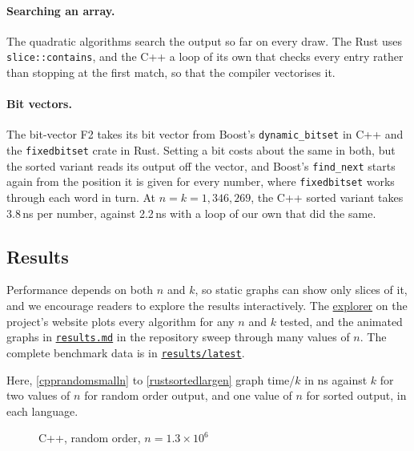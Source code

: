 \documentclass[letterpaper,11pt]{article}
\newcommand{\repo}[2]{\href{https://github.com/ciphergoth/sansreplace/blob/paper_v1/#1}{#2}}
\begin{document}
\paragraph{Searching an array.} The quadratic algorithms search the
output so far on every draw. The Rust uses
\texttt{slice::contains}, and the C++ a loop of its own that
checks every entry rather than stopping at the first match, so that the
compiler vectorises it.

\paragraph{Bit vectors.} The bit-vector F2 takes its bit vector from
Boost's \texttt{dynamic_bitset} in C++ and the
\texttt{fixedbitset} crate in Rust. Setting a bit costs about
the same in both, but the sorted variant reads its output off the
vector, and Boost's \texttt{find_next} starts again from the
position it is given for every number, where
\texttt{fixedbitset} works through each word in turn. At
\(n = k = 1{,}346{,}269\), the C++ sorted variant takes 3.8\,ns per
number, against 2.2\,ns with a loop of our own that did the same.

\subsection{Results}\label{results}

Performance depends on both \(n\) and \(k\), so static graphs can
show only slices of it, and we encourage readers to explore the
results interactively. The
\href{https://ciphergoth.github.io/sansreplace/}{explorer} on the
project's website plots every algorithm for any \(n\) and \(k\)
tested, and the animated graphs in
\repo{results.md}{\texttt{results.md}}
in the repository sweep through many values of \(n\). The complete
benchmark data is in
\href{https://github.com/ciphergoth/sansreplace/tree/paper_v1/results/latest}{\texttt{results/latest}}.

Here, \autoref{cpprandomsmalln} to \autoref{rustsortedlargen} graph
time/\(k\) in ns against \(k\) for two values of \(n\) for random
order output, and one value of \(n\) for sorted output, in each
language.

\begin{figure}
    
    \caption{C++, random order, \(n=1.3 \times 10^{6}\)}
    \label{cpprandomsmalln}
\end{figure}
\end{document}
